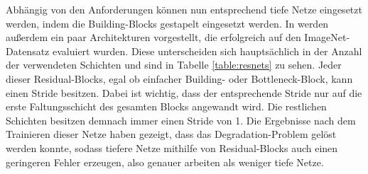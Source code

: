 Abhängig von den Anforderungen können nun entsprechend tiefe Netze eingesetzt
werden, indem die Building-Blocks gestapelt eingesetzt werden. In
\cite{he2015deep} werden außerdem ein paar Architekturen vorgestellt, die
erfolgreich auf den ImageNet-Datensatz \cite{deng2009imagenet} evaluiert wurden.
Diese unterscheiden sich hauptsächlich in der Anzahl der verwendeten Schichten
und sind in Tabelle \ref{table:resnets} zu sehen. Jeder dieser Residual-Blocks,
egal ob einfacher Building- oder Bottleneck-Block, kann einen Stride besitzen.
Dabei ist wichtig, dass der entsprechende Stride nur auf die erste
Faltungsschicht des gesamten Blocks angewandt wird. Die restlichen Schichten
besitzen demnach immer einen Stride von 1. Die Ergebnisse nach dem Trainieren
dieser Netze haben gezeigt, dass das Degradation-Problem gelöst werden konnte,
sodass tiefere Netze mithilfe von Residual-Blocks auch einen geringeren Fehler
erzeugen, also genauer arbeiten als weniger tiefe Netze.

